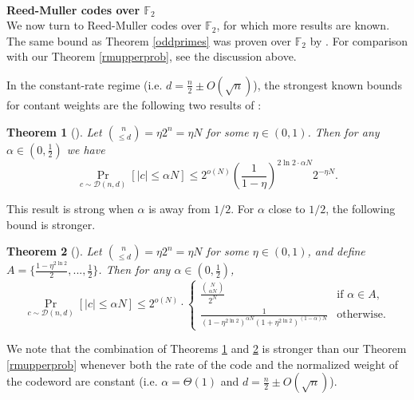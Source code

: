 \documentclass[12pt]{article}
\newtheorem{theorem}{Theorem}
\newcommand{\F}{\mathbb{F}}
\begin{document}
\hfill\\
\textbf{Reed-Muller codes over $\F_2$}
\hfill\\
We now turn to Reed-Muller codes over $\F_2$, for which more results are known. The same bound as Theorem \ref{oddprimes} was proven over $\F_2$ by \cite{ben-eliezer2012weighthalf1}. For comparison with our Theorem \ref{rmupperprob}, see the discussion above.

In the constant-rate regime (i.e. $d=\frac{n}{2}\pm O(\sqrt{n})$), the strongest known bounds for contant weights are the following two results of \cite{samorodnitsky2020weightboundhalf}:

\begin{theorem}[\cite{samorodnitsky2020weightboundhalf}]\label{samorodnitsky1}
Let $\binom{n}{\leq d}=\eta 2^n=\eta N$ for some $\eta\in(0,1)$. Then for any $\alpha\in(0, \frac{1}{2})$ we have
$$\Pr_{c\sim \mathcal{D}(n,d)}[|c|\leq \alpha N ]\leq 2^{o(N)}\left(\frac{1}{1-\eta}\right)^{2\ln2 \cdot \alpha N} 2^{-\eta N}.$$
\end{theorem}
This result is strong when $\alpha$ is away from $ 1/2$. For $\alpha$ close to $1/2$, the following bound is stronger.
\begin{theorem}[\cite{samorodnitsky2020weightboundhalf}]\label{samorodnitsky2}
Let $\binom{n}{\leq d}=\eta 2^n=\eta N$ for some $\eta\in(0,1)$, and define $A=\{\frac{1-\eta^{2\ln 2}}{2},...,\frac{1}{2}\}$. Then for any $\alpha\in(0,\frac{1}{2})$,
$$\Pr_{c\sim \mathcal{D}(n,d)}[|c|\leq \alpha N ]\leq 2^{o(N)}\cdot
\begin{cases}
 \frac{\binom{N}{\alpha N}}{2^{N}}  & \text{if $\alpha\in A$,}\\
\frac{1}{(1-\eta^{2\ln2})^{\alpha N}(1+\eta^{2\ln2})^{(1-\alpha) N}} & \text{otherwise.}
\end{cases}
$$
\end{theorem}
We note that the combination of Theorems \ref{samorodnitsky1} and \ref{samorodnitsky2} is stronger than our Theorem \ref{rmupperprob} whenever both the rate of the code and the normalized weight of the codeword are constant (i.e. $\alpha=\Theta(1)$ and $d=\frac{n}{2}\pm O(\sqrt{n})$). 
\end{document}
